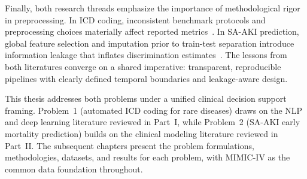 Finally, both research threads emphasize the importance of methodological rigor in preprocessing. In ICD coding, inconsistent benchmark protocols and preprocessing choices materially affect reported metrics~\citep{edin2023automated}. In SA-AKI prediction, global feature selection and imputation prior to train-test separation introduce information leakage that inflates discrimination estimates~\citep{Kang_Yoon_2023}. The lessons from both literatures converge on a shared imperative: transparent, reproducible pipelines with clearly defined temporal boundaries and leakage-aware design.

This thesis addresses both problems under a unified clinical decision support framing. Problem~1 (automated ICD coding for rare diseases) draws on the NLP and deep learning literature reviewed in Part~I, while Problem~2 (SA-AKI early mortality prediction) builds on the clinical modeling literature reviewed in Part~II. The subsequent chapters present the problem formulations, methodologies, datasets, and results for each problem, with MIMIC-IV as the common data foundation throughout.
